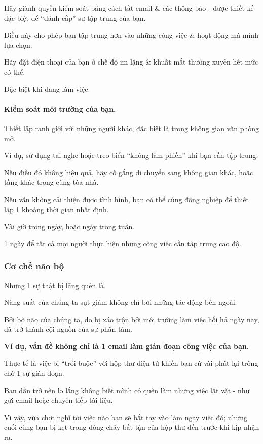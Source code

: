 \documentclass{article}
\begin{document}
Hãy giành quyền kiểm soát bằng cách tắt email \& các thông báo - được thiết kế đặc biệt để ``đánh cắp'' sự tập trung của bạn.

Điều này cho phép bạn tập trung hơn vào những công việc \& hoạt động mà mình lựa chọn.

Hãy đặt điện thoại của bạn ở chế độ im lặng \& khuất mắt thường xuyên hết mức có thể.

Đặc biệt khi đang làm việc.

\paragraph{Kiểm soát môi trường của bạn.} Thiết lập ranh giới với những người khác, đặc biệt là trong không gian văn phòng mở.

Ví dụ, sử dụng tai nghe hoặc treo biển ``không làm phiền'' khi bạn cần tập trung.

Nếu điều đó không hiệu quả, hãy cố gắng di chuyển sang không gian khác, hoặc tầng khác trong cùng tòa nhà.

Nếu vẫn không cải thiện được tình hình, bạn có thể cùng đồng nghiệp để thiết lập 1 khoảng thời gian nhất định.

Vài giờ trong ngày, hoặc ngày trong tuần.

1 ngày để tất cả mọi người thực hiện những công việc cần tập trung cao độ.

\subsubsection{Cơ chế não bộ}
Nhưng 1 sự thật bị lãng quên là.

Năng suất của chúng ta sụt giảm không chỉ bởi những tác động bên ngoài.

Bởi bộ não của chúng ta, do bị xáo trộn bởi môi trường làm việc hối hả ngày nay, đã trở thành cội nguồn của sự phân tâm.

\textbf{Ví dụ, vấn đề không chỉ là 1 email làm gián đoạn công việc của bạn.}

Thực tế là việc bị ``trói buộc'' với hộp thư điện tử khiến bạn cứ vài phút lại trông chờ 1 sự gián đoạn.

Bạn dần trở nên lo lắng không biết mình có quên làm những việc lặt vặt - như gửi email hoặc chuyển tiếp tài liệu.

Vì vậy, vừa chợt nghĩ tới việc nào bạn sẽ bắt tay vào làm ngay việc đó; nhưng cuối cùng bạn bị kẹt trong dòng chảy bất tận của hộp thư đến trước khi kịp nhận ra.
\end{document}
